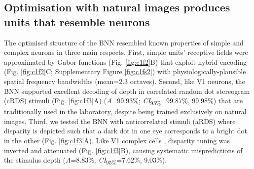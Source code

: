{\subsection{Optimisation with natural images produces units that resemble neurons}

The optimised structure of the BNN resembled known properties of simple and complex neurons in three main respects. First, simple units' receptive fields were approximated by Gabor functions (Fig. \ref{fig:c1f2}B) that exploit hybrid encoding (Fig. \ref{fig:c1f2}C; Supplementary Figure \ref{fig:c1fs2}) \cite{DeAngelis:1991mb, Prince:2002uq, Tsao:2003pi} with physiologically-plausible spatial frequency bandwidths (mean=2.3 octaves). Second, like V1 neurons, the BNN supported excellent decoding of depth in correlated random dot stereogram (cRDS) stimuli (Fig. \ref{fig:c1f3}A) ({\it A}=99.93\%; {\it CI}\textsubscript{95\%}=99.87\%, 99.98\%) that are traditionally used in the laboratory, despite being trained exclusively on natural images. Third, we tested the BNN with anticorrelated stimuli (aRDS) where disparity is depicted such that a dark dot in one eye corresponds to a bright dot in the other (Fig. \ref{fig:c1f3}A). Like V1 complex cells \cite{Ohzawa:1990cq,Cumming:1997ve, Samonds:2013cs}, disparity tuning was inverted and attenuated (Fig. \ref{fig:c1f3}B), causing systematic mispredictions of the stimulus depth ({\it A}=8.83\%; {\it CI}\textsubscript{95\%}=7.62\%, 9.03\%). 

}
